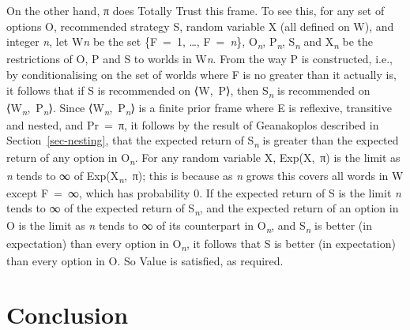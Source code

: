 \documentclass[
  10pt,
  letterpaper,
  DIV=11,
  numbers=noendperiod,
  twoside]{scrartcl}
\begin{document}
On the other hand, π does Totally Trust this frame. To see this, for any
set of options O, recommended strategy S, random variable X (all defined
on W), and integer \emph{n}, let W\emph{n} be the set \{F~=~1, \ldots,
F~=~\emph{n}\}, O\textsubscript{\emph{n}}, P\textsubscript{\emph{n}},
S\textsubscript{\emph{n}} and X\textsubscript{\emph{n}} be the
restrictions of O, P and S to worlds in W\emph{n}. From the way P is
constructed, i.e., by conditionalising on the set of worlds where F is
no greater than it actually is, it follows that if S is recommended on
⟨W,~P⟩, then S\textsubscript{\emph{n}} is recommended on
⟨W\textsubscript{\emph{n}},~P\textsubscript{\emph{n}}⟩. Since
⟨W\textsubscript{\emph{n}},~P\textsubscript{\emph{n}}⟩ is a finite prior
frame where E is reflexive, transitive and nested, and Pr~=~π, it
follows by the result of Geanakoplos described in
Section~\ref{sec-nesting}, that the expected return of
S\textsubscript{\emph{n}} is greater than the expected return of any
option in O\textsubscript{\emph{n}}. For any random variable X,
Exp(X,~π) is the limit as \emph{n} tends to ∞ of
Exp(X\textsubscript{\emph{n}},~π); this is because as \emph{n} grows
this covers all words in W except F~=~∞, which has probability 0. If the
expected return of S is the limit \emph{n} tends to ∞ of the expected
return of S\emph{\textsubscript{n}}, and the expected return of an
option in O is the limit as \emph{n} tends to ∞ of its counterpart in
O\textsubscript{\emph{n}}, and S\emph{\textsubscript{n}} is better (in
expectation) than every option in O\textsubscript{\emph{n}}, it follows
that S is better (in expectation) than every option in O. So Value is
satisfied, as required.

\section{Conclusion}\label{conclusion}
\end{document}
